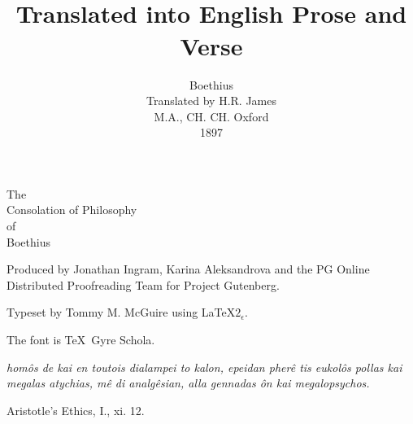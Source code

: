 \documentclass[12pt]{book}
\title{\simpletitle \\[1em] {\small Translated into English Prose and Verse}}
\author{Boethius \\[2em] Translated by H.R. James \\ {\small M.A., CH. CH. Oxford} \\[2em] 1897}
\date{}
\newcommand{\simpletitle}{The \\ Consolation of Philosophy \\ of \\ Boethius}
\begin{document}
\setlength{\baselineskip}{1.2\baselineskip}

\frontmatter

\thispagestyle{empty}
\hspace{0pt}
\vfill
\begin{center}
  \Large
  \simpletitle
\end{center}
\vfill
\pagebreak

\thispagestyle{empty}
\hspace{0pt}
\vfill

\noindent Produced by Jonathan Ingram, Karina Aleksandrova and the PG Online Distributed Proofreading Team for Project Gutenberg.

\noindent Typeset by Tommy M. McGuire using \LaTeX $2_\epsilon$.

\noindent The font is \TeX\ Gyre Schola.

\pagebreak

\thispagestyle{empty}
\hspace{0pt}
\vfill


\noindent \emph{homôs de kai en toutois dialampei to kalon, epeidan pherê tis eukolôs pollas kai megalas atychias, mê di analgêsian, alla gennadas ôn kai \mbox{megalopsychos.}}

Aristotle's Ethics, I., xi. 12.

\vfill

\pagebreak
\thispagestyle{empty}
\hspace{0pt}
\vfill
\end{document}
